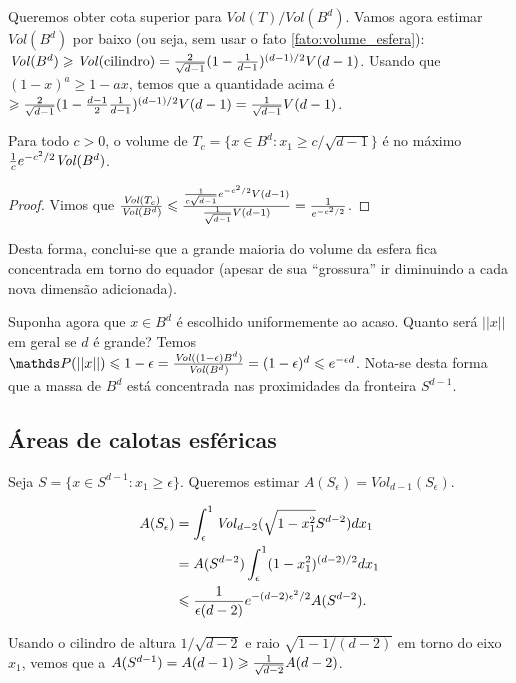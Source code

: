 Queremos obter cota superior para $\mathit{Vol}(T)/\mathit{Vol}(B^d)$. Vamos agora estimar $\mathit{Vol}(B^d)$ por baixo (ou seja, sem usar o fato \ref{fato:volume_esfera}): $\mathit{Vol}(B^d) \geqslant \mathit{Vol}(\mathrm{cilindro}) = {2\over \sqrt{d-1}} (1-{1 \over d-1})^{(d-1)/2} V(d-1)$. Usando que $(1-x)^a \geqslant 1-ax$, temos que a quantidade acima é $\geqslant {2\over \sqrt{d-1}} (1-{d-1 \over 2}{1 \over d-1})^{(d-1)/2} V(d-1) = {1 \over \sqrt{d-1}} V(d-1)$.

\begin{lema}
 Para todo $c > 0$, o volume de $T_c = \{x \in B^d: x_1 \geqslant c/\sqrt{d-1}\}$ é no máximo ${1\over c} e^{-c^2/2} \mathit{Vol}(B^d)$.
\end{lema}

\begin{proof}
Vimos que ${\mathit{Vol}(T_c) \over \mathit{Vol}(B^d)} \leqslant {{1\over c\sqrt{d-1}} e^{-c^2/2} V(d-1) \over {1\over \sqrt{d-1}} V(d-1)} = {1\over e^{-c^2/2}}$.
\end{proof}

Desta forma, conclui-se que a grande maioria do volume da esfera fica concentrada em torno do equador (apesar de sua “grossura” ir diminuindo a cada nova dimensão adicionada).

Suponha agora que $x \in B^d$ é escolhido uniformemente ao acaso. Quanto será $||x||$ em geral se $d$ é grande? Temos $\PP(||x||) \leqslant 1-\epsilon = {\mathit{Vol}((1-\epsilon)B^d) \over \mathit{Vol}(B^d)} = (1-\epsilon)^d \leqslant e^{-\epsilon d}$. Nota-se desta forma que a massa de $B^d$ está concentrada nas proximidades da fronteira $S^{d-1}$.

\subsection{Áreas de calotas esféricas}

Seja $S = \{x \in S^{d-1}: x_1 \geqslant \epsilon\}$. Queremos estimar $A(S_\epsilon) = \mathit{Vol}_{d-1}(S_\epsilon)$.

\begin{align*}
  A(S_\epsilon) &= \int_\epsilon^1 \mathit{Vol}_{d-2}(\sqrt{1-x_1^2}S^{d-2}) dx_1 \\
      &= A(S^{d-2}) \int_\epsilon^1 (1-x_1^2)^{(d-2)/2} dx_1 \\
      &\leqslant {1\over \epsilon (d-2) } e^{-(d-2)\epsilon^2/2} A(S^{d-2}).
\end{align*}

Usando o cilindro de altura $1/\sqrt{d-2}$ e raio $\sqrt{1- 1/(d-2)}$ em torno do eixo $x_1$, vemos que a $A(S^{d-1}) = A(d-1) \geqslant {1 \over \sqrt{d-2}} A(d-2)$.

